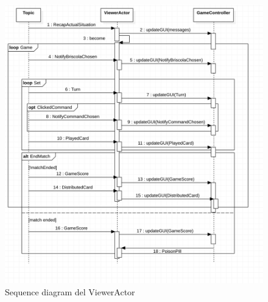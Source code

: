 \begin{itemize}
         \begin{figure}[!tbh]
    \centering
 	 \includegraphics[width=\linewidth]{sequenceDiagramViewerActor.png}
 	 \caption{Sequence diagram del ViewerActor}
  	\label{fig:viewer_actor}
	\end{figure}


	\clearpage



\end{itemize}
